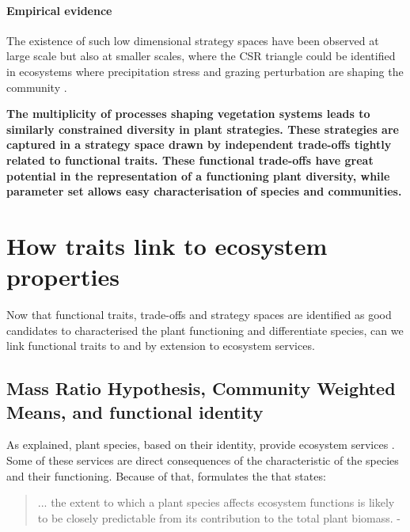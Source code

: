 \paragraph{Empirical evidence}

The existence of such low dimensional strategy spaces have been observed at large scale \parencite{ pierce_allocating_2013, diaz_global_2016} but also at smaller scales, where the CSR triangle could be identified in ecosystems where precipitation stress and grazing perturbation are shaping the community \cite{frenette-dussault_functional_2012}.

\textbf{The multiplicity of processes shaping vegetation systems leads to similarly constrained diversity in plant strategies. These strategies are captured in a strategy space drawn by independent trade-offs tightly related to functional traits. These functional trade-offs have great potential in the representation of a functioning plant diversity, while parameter set allows easy characterisation of species and communities.}



\section{How traits link to ecosystem properties}

Now that functional traits, trade-offs and strategy spaces are identified as good candidates to characterised the plant functioning and differentiate species, can we link functional traits to  and by extension to ecosystem services.

\subsection{Mass Ratio Hypothesis, Community Weighted Means, and functional identity}

As explained, plant species, based on their identity, provide ecosystem services \parencite{mokany_functional_2008}. Some of these services are direct consequences of the characteristic of the species and their functioning. Because of that, \cite{grime_benefits_1998} formulates the  that states: 

\begin{quotation}
... the extent to which a plant species affects ecosystem functions is likely to be closely predictable from its contribution to the total plant biomass. - \cite{grime_benefits_1998}
\end{quotation}

